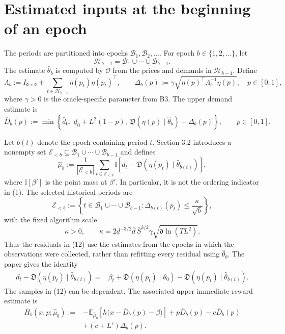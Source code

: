\documentclass[11pt]{article}
\begin{document}
\section*{Estimated inputs at the beginning of an epoch}
The periods are partitioned into epochs \(\mathcal B_1,\mathcal B_2,\ldots\). For epoch \(b\in\{1,2,\ldots\}\), let
\[
\mathcal H_{b-1}=\mathcal B_1\cup\cdots\cup\mathcal B_{b-1}.
\]
The estimate \(\widehat\theta_b\) is computed by \(\mathcal O\) from the prices and demands in \(\mathcal H_{b-1}\). Define
\[
\Lambda_b:=I_{\mathfrak d\times\mathfrak d}
+\sum_{t\in\mathcal H_{b-1}}\eta(p_t)\eta(p_t)^\top,
\qquad
\Delta_b(p):=\gamma\sqrt{\eta(p)^\top\Lambda_b^{-1}\eta(p)},
\quad p\in[0,1],
\]
where \(\gamma>0\) is the oracle-specific parameter from B3. The upper demand estimate is
\begin{equation}
\overline D_b(p):=
\min\left\{\bar d_0,\ \underline d_0+L^2(1-p),\
\mathfrak D(\eta(p)\mid\widehat\theta_b)+\Delta_b(p)\right\},
\qquad p\in[0,1].
\tag{11}
\end{equation}

Let \(b(t)\) denote the epoch containing period \(t\). Section 3.2 introduces a nonempty set
\(\mathcal E_{<b}\subseteq\mathcal B_1\cup\cdots\cup\mathcal B_{b-1}\) and defines
\begin{equation}
\widehat\mu_b:=\frac{1}{|\mathcal E_{<b}|}
\sum_{t\in\mathcal E_{<b}}
\mathbb I\!\left[d_t-\mathfrak D(\eta(p_t)\mid\widehat\theta_{b(t)})\right],
\tag{12}
\end{equation}
where \(\mathbb I[\beta']\) is the point mass at \(\beta'\). In particular, it is not the ordering indicator in (1). The selected historical periods are
\begin{equation}
\mathcal E_{<b}:=
\left\{t\in\mathcal B_1\cup\cdots\cup\mathcal B_{b-1}:
\Delta_{b(t)}(p_t)\leq\frac{\kappa}{\sqrt b}\right\},
\tag{13}
\end{equation}
with the fixed algorithm scale
\[
\kappa>0,\qquad
\kappa=2\underline d^{-3/2}\bar d\,\bar S^{3/2}\gamma
\sqrt{\mathfrak d\ln(TL^2)}.
\]
Thus the residuals in (12) use the estimates from the epochs in which the observations were collected, rather than refitting every residual using \(\widehat\theta_b\). The paper gives the identity
\[
\begin{aligned}
d_t-\mathfrak D(\eta(p_t)\mid\widehat\theta_{b(t)})
={}&\beta_t+\mathfrak D(\eta(p_t)\mid\theta_0)
-\mathfrak D(\eta(p_t)\mid\widehat\theta_{b(t)}).
\end{aligned}
\]
The samples in (12) can be dependent. The associated upper immediate-reward estimate is
\begin{equation}
\begin{aligned}
\overline H_b(x,p;\widehat\mu_b):={}&
-\mathbb E_{\widehat\mu_b}\!\left[h\bigl(x-\overline D_b(p)-\beta\bigr)\right]
+p\overline D_b(p)-c\overline D_b(p)\\
&+(c+L')\Delta_b(p).
\end{aligned}
\tag{14}
\end{equation}
\end{document}
